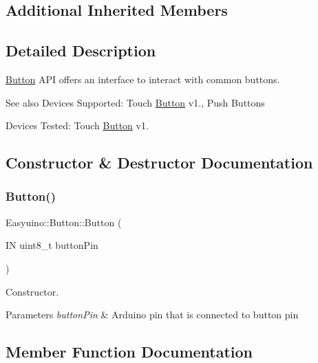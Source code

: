 \subsection*{Additional Inherited Members}


\subsection{Detailed Description}
\hyperlink{class_easyuino_1_1_button}{Button} A\+PI offers an interface to interact with common buttons. 

\begin{DoxySeeAlso}{See also}
Devices Supported\+: Touch \hyperlink{class_easyuino_1_1_button}{Button} v1., Push Buttons 

Devices Tested\+: Touch \hyperlink{class_easyuino_1_1_button}{Button} v1. 
\end{DoxySeeAlso}


\subsection{Constructor \& Destructor Documentation}
\mbox{\label{class_easyuino_1_1_button_af0b54aae0c20a523d87681bf5f110590}} 
\subsubsection{\texorpdfstring{Button()}{Button()}}
{\footnotesize\ttfamily Easyuino\+::\+Button\+::\+Button (\begin{DoxyParamCaption}\item[{IN uint8\+\_\+t}]{button\+Pin }\end{DoxyParamCaption})}



Constructor. 


\begin{DoxyParams}{Parameters}
{\em button\+Pin} & Arduino pin that is connected to button pin \\
\hline
\end{DoxyParams}


\subsection{Member Function Documentation}
\mbox{\label{class_easyuino_1_1_button_a3505f6abb646e92130701d5a1b285c76}} 
